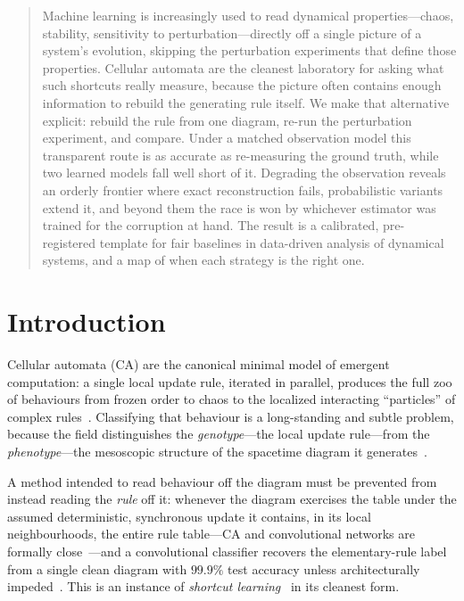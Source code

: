 \documentclass[aip,cha,amsmath,amssymb,reprint,floatfix]{revtex4-2}
\begin{document}
\maketitle

\begin{quotation}
Machine learning is increasingly used to read dynamical properties---chaos,
stability, sensitivity to perturbation---directly off a single picture of a
system's evolution, skipping the perturbation experiments that define those
properties. Cellular automata are the cleanest laboratory for asking what
such shortcuts really measure, because the picture often contains enough
information to rebuild the generating rule itself. We make that alternative
explicit: rebuild the rule from one diagram, re-run the perturbation
experiment, and compare. Under a matched observation model this transparent
route is as accurate as re-measuring the ground truth, while two learned
models fall well short of it. Degrading the observation reveals an orderly
frontier where exact reconstruction fails, probabilistic variants extend it,
and beyond them the race is won by whichever estimator was trained for the
corruption at hand. The result is a calibrated, pre-registered template for
fair baselines in data-driven analysis of dynamical systems, and a map of
when each strategy is the right one.
\end{quotation}

\section{Introduction}
\label{sec:intro}

Cellular automata (CA) are the canonical minimal model of emergent computation:
a single local update rule, iterated in parallel, produces the full zoo of
behaviours from frozen order to chaos to the localized interacting ``particles''
of complex rules~\cite{wolfram1984,wolfram2002,langton1990,boccara1991,rollier2025taxonomy}. Classifying that behaviour is a
long-standing and subtle problem, because the field distinguishes the
\emph{genotype}---the local update rule---from the \emph{phenotype}---the
mesoscopic structure of the spacetime diagram it
generates~\cite{vispoel2022progress,rollier2025taxonomy}.

A method intended
to read behaviour off the diagram must be prevented from instead reading the
\emph{rule} off it: whenever the diagram exercises the table under the
assumed deterministic, synchronous update it contains, in its local
neighbourhoods, the entire rule table---CA and convolutional networks are
formally close~\cite{gilpin2019}---and a convolutional classifier recovers
the elementary-rule label from a single clean diagram with $99.9\%$ test
accuracy unless architecturally impeded~\cite{rollier2024cnn}. This is an instance of
\emph{shortcut learning}~\cite{geirhos2020shortcut} in its cleanest form.
\end{document}
